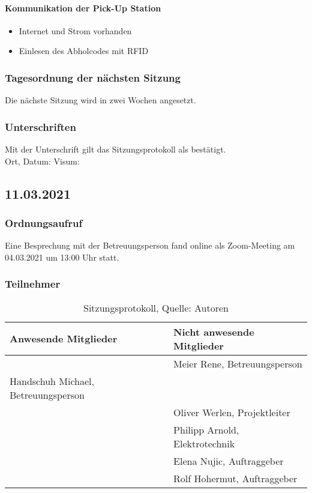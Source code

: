 \paragraph{Kommunikation der Pick-Up Station}
	\begin{itemize}
	\item Internet und Strom vorhanden
	\item Einlesen des Abholcodes mit RFID
\end{itemize}

\subsubsection{Tagesordnung der nächsten Sitzung}
Die nächste Sitzung wird in zwei Wochen angesetzt. 

\subsubsection{Unterschriften}

Mit der Unterschrift gilt das Sitzungsprotokoll als bestätigt.\\

Ort, Datum:	\underline{\hspace*{6cm}}	\hspace*{1cm} Visum:	\underline{\hspace*{4cm}}


\subsection{11.03.2021}\label{Beteuermeeting1}
\subsubsection{Ordnungsaufruf}
Eine Besprechung mit der Betreuungsperson fand online als Zoom-Meeting am 04.03.2021 um 13:00 Uhr statt.
\subsubsection{Teilnehmer}
\begin{table}[H]
	\setlength\extrarowheight{2pt} %
	\begin{tabularx}{\textwidth}{|X|X|}
		\hline
		\textbf{Anwesende Mitglieder} &  \textbf{Nicht anwesende Mitglieder} \\
		\hline
		& Meier Rene, Betreuungsperson  \\
		Handschuh Michael, Betreuungsperson &   \\
		&Oliver Werlen, Projektleiter \\
		&Philipp Arnold, Elektrotechnik \\
		&Elena Nujic, Auftraggeber \\
		&Rolf Hohermut, Auftraggeber \\
		\hline
	\end{tabularx}
	\caption{ \label{tbl: Teilnehmerliste vom 04.03.2021}Sitzungsprotokoll, Quelle: Autoren}
\end{table}

